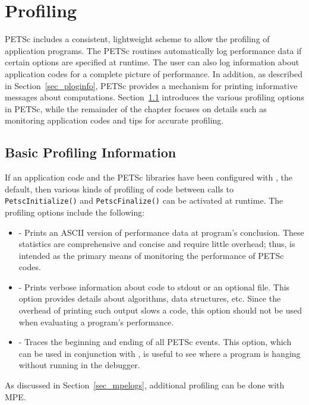 \chapter{Profiling}
\label{ch_profiling} 

PETSc includes a consistent, lightweight scheme to allow the profiling
of application programs.  The PETSc routines automatically log
performance data if certain options are specified at runtime.  The
user can also log information about application codes for a complete
picture of performance.  In addition, as described in
Section~\ref{sec_ploginfo}, PETSc provides a mechanism for printing
informative messages about computations.  Section~\ref{sec_profbasic}
introduces the various profiling options in PETSc, while the
remainder of the chapter focuses on details such as monitoring
application codes and tips for accurate profiling.

\section{Basic Profiling Information}
\label{sec_profbasic}
  

If an application code and the PETSc libraries have been configured with
, the default,
then various kinds of profiling of code between calls to \lstinline{PetscInitialize()} and \lstinline{PetscFinalize()} can be
activated at runtime.  The profiling options include the following:
 
\begin{itemize}
\item {} - Prints an ASCII version of performance data
     at program's conclusion. These statistics are comprehensive and concise
     and require little overhead; thus,  is intended as
     the primary means of monitoring the performance of PETSc codes.
\item {} - Prints verbose information about code to
     stdout or an optional file. This option provides details about algorithms,
     data structures, etc. Since the overhead of printing such output slows a
     code, this option should not be used when evaluating a program's performance.
\item {} - Traces the beginning and ending of all
     PETSc events.  This option, which can be used in conjunction with
     , is useful to see where a program is hanging
     without running in the debugger.
\end{itemize}
 As discussed in Section~\ref{sec_mpelogs},
additional profiling can be done with MPE.

